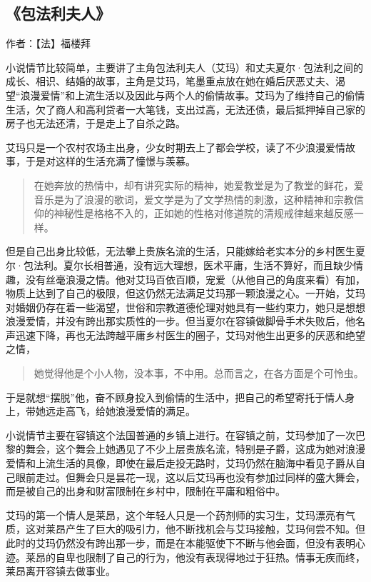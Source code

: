 \subsection{《包法利夫人》}

作者：【法】福楼拜

小说情节比较简单，主要讲了主角包法利夫人（艾玛）和丈夫夏尔·包法利之间的成长、相识、结婚的故事，主角是艾玛，笔墨重点放在她在婚后厌恶丈夫、渴望“浪漫爱情”和上流生活以及因此与两个人的偷情故事。艾玛为了维持自己的偷情生活，欠了商人和高利贷者一大笔钱，支出过高，无法还债，最后抵押掉自己家的房子也无法还清，于是走上了自杀之路。

艾玛只是一个农村农场主出身，少女时期去上了都会学校，读了不少浪漫爱情故事，于是对这样的生活充满了憧憬与羡慕。
\begin{quotation}
在她奔放的热情中，却有讲究实际的精神，她爱教堂是为了教堂的鲜花，爱音乐是为了浪漫的歌词，爱文学是为了文学热情的刺激，这种精神和宗教信仰的神秘性是格格不入的，正如她的性格对修道院的清规戒律越来越反感一样。
\end{quotation}

但是自己出身比较低，无法攀上贵族名流的生活，只能嫁给老实本分的乡村医生夏尔·包法利。夏尔长相普通，没有远大理想，医术平庸，生活不算好，而且缺少情趣，没有丝毫浪漫之情。他对艾玛百依百顺，宠爱（从他自己的角度来看）有加，物质上达到了自己的极限，但这仍然无法满足艾玛那一颗浪漫之心。一开始，艾玛对婚姻仍存在着一些渴望，世俗和宗教道德伦理对她具有一些约束力，她只是想想浪漫爱情，并没有跨出那实质性的一步。但当夏尔在容镇做脚骨手术失败后，他名声迅速下降，再也无法跨越平庸乡村医生的圈子，艾玛对他生出更多的厌恶和绝望之情，
\begin{quotation}
她觉得他是个小人物，没本事，不中用。总而言之，在各方面是个可怜虫。
\end{quotation}

于是就想“摆脱”他，奋不顾身投入到偷情的生活中，把自己的希望寄托于情人身上，带她远走高飞，给她浪漫爱情的满足。

小说情节主要在容镇这个法国普通的乡镇上进行。在容镇之前，艾玛参加了一次巴黎的舞会，这个舞会上她遇见了不少上层贵族名流，特别是子爵，这成为她对浪漫爱情和上流生活的具像，即使在最后走投无路时，艾玛仍然在脑海中看见子爵从自己眼前走过。但舞会只是昙花一现，这以后艾玛再也没有参加过同样的盛大舞会，而是被自己的出身和财富限制在乡村中，限制在平庸和粗俗中。

艾玛的第一个情人是莱昂，这个年轻人只是一个药剂师的实习生，艾玛漂亮有气质，这对莱昂产生了巨大的吸引力，他不断找机会与艾玛接触，艾玛何尝不知。但此时的艾玛仍然没有跨出那一步，而是在本能驱使下不断与他会面，但没有表明心迹。莱昂的自卑也限制了自己的行为，他没有表现得地过于狂热。情事无疾而终，莱昂离开容镇去做事业。

